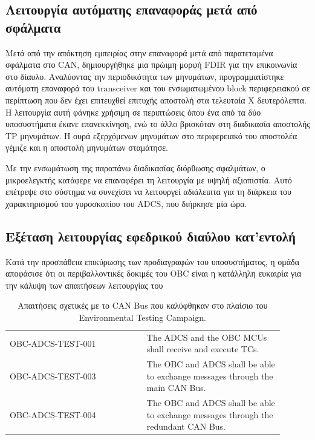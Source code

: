 \documentclass[a4paper,nobib,justified]{tufte-book}
\begin{document}
\subsection{Λειτουργία αυτόματης επαναφοράς μετά από σφάλματα}
Μετά από την απόκτηση εμπειρίας στην επαναφορά μετά από παρατεταμένα σφάλματα στο CAN, δημιουργήθηκε μια πρώιμη μορφή FDIR για την επικοινωνία στο δίαυλο. Αναλύοντας την περιοδικότητα των μηνυμάτων, προγραμματίστηκε αυτόματη επαναφορά του transceiver και του ενσωματωμένου block περιφερειακού σε περίπτωση που δεν έχει επιτευχθεί επιτυχής αποστολή στα τελευταία X δευτερόλεπτα. Η λειτουργία αυτή φάνηκε χρήσιμη σε περιπτώσεις όπου ένα από τα δύο υποσυστήματα έκανε επανεκκίνηση, ενώ το άλλο βρισκόταν στη διαδικασία αποστολής TP μηνυμάτων. Η ουρά εξερχόμενων μηνυμάτων στο περιφερειακό του αποστολέα γέμιζε και η αποστολή μηνυμάτων σταμάτησε.

Με την ενσωμάτωση της παραπάνω διαδικασίας διόρθωσης σφαλμάτων, ο μικροελεγκτής κατάφερε να επαναφέρει τη λειτουργία με υψηλή αξιοπιστία. Αυτό επέτρεψε στο σύστημα να συνεχίσει να λειτουργεί αδιάλειπτα για τη διάρκεια του χαρακτηρισμού του γυροσκοπίου του ADCS, που διήρκησε μία ώρα.

\clearpage
\subsection{Εξέταση λειτουργίας εφεδρικού διαύλου κατ'εντολή}
\label{chap:switch-tc}
Κατά την προσπάθεια επικύρωσης των προδιαγραφών του υποσυστήματος, η ομάδα αποφάσισε ότι οι περιβαλλοντικές δοκιμές του OBC είναι η κατάλληλη ευκαιρία για την κάλυψη των απαιτήσεων λειτουργίας του 

\begin{table}
    \centering
    \caption[Απαιτήσεις σχετικές με το CAN Bus]{Απαιτήσεις σχετικές με το CAN Bus που καλύφθηκαν στο πλαίσιο του Environmental Testing Campaign.}
    \label{tab:campaign-requirements}
    \begin{tabular}{|p{0.45\linewidth}|p{0.45\linewidth}|}
        \hline
        \rowcolor[HTML]{4F5054}
        \multicolumn{2}{|c|}{\color[HTML]{FFFFFF} Requirements} \\ \hline
        \rowcolor[HTML]{F0F0F1} OBC-ADCS-TEST-001 & The ADCS and the OBC MCUs shall receive and execute TCs. \\ \hline
        \rowcolor[HTML]{F0F0F1} OBC-ADCS-TEST-003 & The OBC and ADCS shall be able to exchange messages through the main CAN Bus. \\ \hline
        \rowcolor[HTML]{F0F0F1} OBC-ADCS-TEST-004 & The OBC and ADCS shall be able to exchange messages through the redundant CAN Bus. \\ \hline
    \end{tabular}
\end{table}
\end{document}
